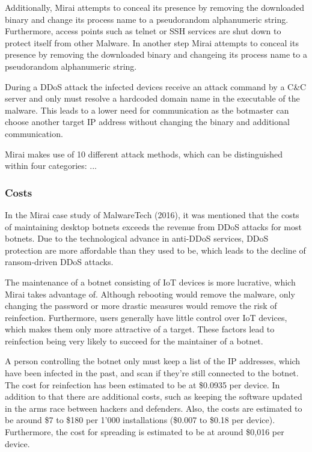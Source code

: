 Additionally, Mirai attempts to conceal its presence by removing the downloaded binary and change its process name to a pseudorandom alphanumeric string. Furthermore, access points such as telnet or SSH services are shut down to protect itself from other Malware. In another step Mirai attempts to conceal its presence by removing the downloaded binary and changeing its process name to a pseudorandom alphanumeric string. \cite{Kolias17}

During a DDoS attack the infected devices receive an attack command by a C\&C server and only must resolve a hardcoded domain name in the executable of the malware. This leads to a lower need for communication as the botmaster can choose another target IP address without changing the binary and additional communication.\cite{Kolias17}

Mirai makes use of 10 different attack methods, which can be distinguished within four categories: ...

	\subsubsection{Costs}
	In the Mirai case study of MalwareTech (2016), it was mentioned that the costs of maintaining desktop botnets exceeds the revenue from DDoS attacks for most botnets. Due to the technological advance in anti-DDoS services, DDoS protection are more affordable than they used to be, which leads to the decline of ransom-driven DDoS attacks. \cite{MalwareTech16}
	
The maintenance of a botnet consisting of IoT devices is more lucrative, which Mirai takes advantage of. Although rebooting would remove the malware, only changing the password or more drastic measures would remove the risk of reinfection. Furthermore, users generally have little control over IoT devices, which makes them only more attractive of a target. These factors lead to reinfection being very likely to succeed for the maintainer of a botnet. \cite{MalwareTech16}

A person controlling the botnet only must keep a list of the IP addresses, which have been infected in the past, and scan if they're still connected to the botnet. The cost for reinfection has been estimated to be at \$0.0935 per device. In addition to that there are additional costs, such as keeping the software updated in the arms race between hackers and defenders.
Also, the costs are estimated to be around \$7 to \$180 per 1'000 installations (\$0.007 to \$0.18 per device). Furthermore, the cost for spreading is estimated to be at around \$0,016 per device.

